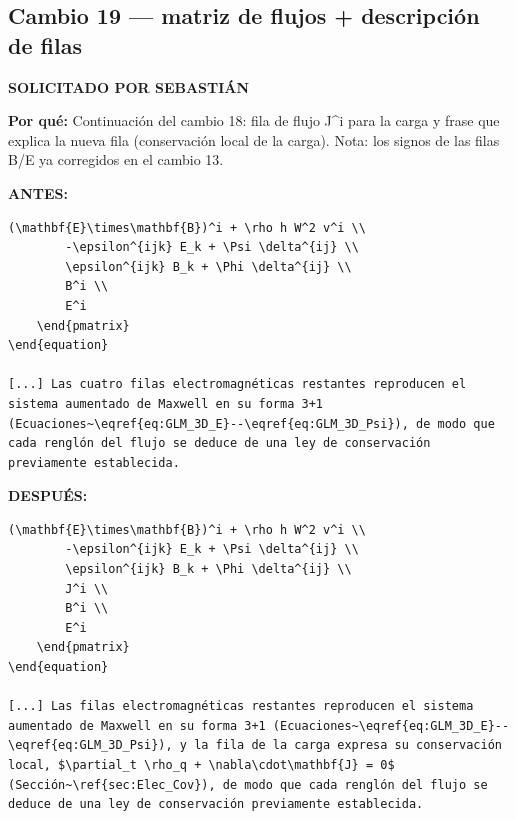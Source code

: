 \documentclass[11pt,a4paper]{article}
\begin{document}
\subsection*{Cambio 19 --- matriz de flujos + descripción de filas}
\colorbox{usrbg}{\textbf{\footnotesize SOLICITADO POR SEBASTIÁN}}

\textbf{Por qué:} Continuación del cambio 18: fila de flujo J\textasciicircum{}i para la carga y frase que explica la nueva fila (conservación local de la carga). Nota: los signos de las filas B/E ya corregidos en el cambio 13.

\textcolor{antesline}{\textbf{ANTES:}}
\begin{Verbatim}[breaklines=true, breakanywhere=true, fontsize=\small, frame=leftline, rulecolor=\color{antesline}, framerule=1.2pt]
        (\mathbf{E}\times\mathbf{B})^i + \rho h W^2 v^i \\
        -\epsilon^{ijk} E_k + \Psi \delta^{ij} \\
        \epsilon^{ijk} B_k + \Phi \delta^{ij} \\
        B^i \\
        E^i
    \end{pmatrix}
\end{equation}

[...] Las cuatro filas electromagnéticas restantes reproducen el sistema aumentado de Maxwell en su forma 3+1 (Ecuaciones~\eqref{eq:GLM_3D_E}--\eqref{eq:GLM_3D_Psi}), de modo que cada renglón del flujo se deduce de una ley de conservación previamente establecida.
\end{Verbatim}
\textcolor{despline}{\textbf{DESPUÉS:}}
\begin{Verbatim}[breaklines=true, breakanywhere=true, fontsize=\small, frame=leftline, rulecolor=\color{despline}, framerule=1.2pt]
        (\mathbf{E}\times\mathbf{B})^i + \rho h W^2 v^i \\
        -\epsilon^{ijk} E_k + \Psi \delta^{ij} \\
        \epsilon^{ijk} B_k + \Phi \delta^{ij} \\
        J^i \\
        B^i \\
        E^i
    \end{pmatrix}
\end{equation}

[...] Las filas electromagnéticas restantes reproducen el sistema aumentado de Maxwell en su forma 3+1 (Ecuaciones~\eqref{eq:GLM_3D_E}--\eqref{eq:GLM_3D_Psi}), y la fila de la carga expresa su conservación local, $\partial_t \rho_q + \nabla\cdot\mathbf{J} = 0$ (Sección~\ref{sec:Elec_Cov}), de modo que cada renglón del flujo se deduce de una ley de conservación previamente establecida.
\end{Verbatim}
\end{document}
